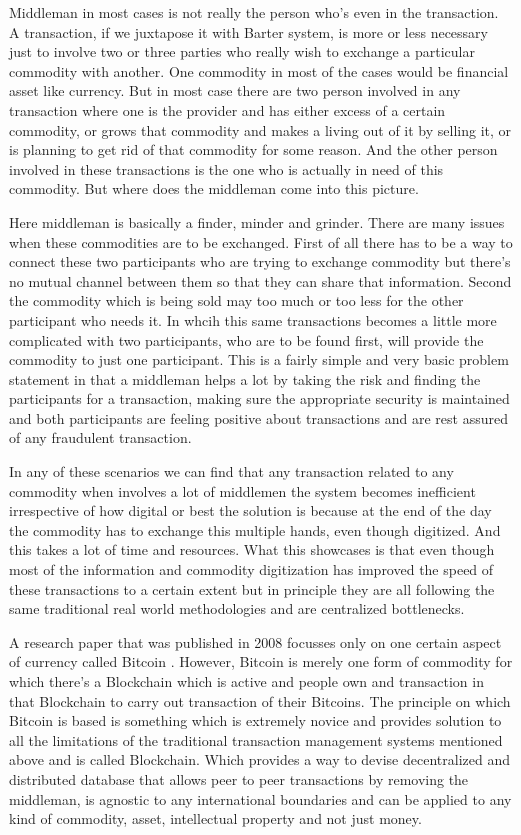 Middleman in most cases is not really the person who's even in the transaction. A transaction, if we juxtapose it with Barter system, is more or less necessary just to involve two or three parties who really wish to exchange a particular commodity with another. One commodity in most of the cases would be financial asset like currency. But in most case there are two person involved in any transaction where one is the provider and has either excess of a certain commodity, or grows that commodity and makes a living out of it by selling it, or is planning to get rid of that commodity for some reason. And the other person involved in these transactions is the one who is actually in need of this commodity. But where does the middleman come into this picture.

Here middleman is basically a finder, minder and grinder. There are many issues when these commodities are to be exchanged. First of all there has to be a way to connect these two participants who are trying to exchange commodity but there's no mutual channel between them so that they can share that information. Second the commodity which is being sold may too much or too less for the other participant who needs it. In whcih this same transactions becomes a little more complicated with two participants, who are to be found first, will provide the commodity to just one participant. This is a fairly simple and very basic problem statement in that a middleman helps a lot by taking the risk and finding the participants for a transaction, making sure the appropriate security is maintained and both participants are feeling positive about transactions and are rest assured of any fraudulent transaction.

In any of these scenarios we can find that any transaction related to any commodity when involves a lot of middlemen the system becomes inefficient irrespective of how digital or best the solution is because at the end of the day the commodity has to exchange this multiple hands, even though digitized. And this takes a lot of time and resources. What this showcases is that even though most of the information and commodity digitization has improved the speed of these transactions to a certain extent but in principle they are all following the same traditional real world methodologies and are centralized bottlenecks.

A research paper that was published in 2008 focusses only on one certain aspect of currency called Bitcoin \cite{bitcoin12}. However, Bitcoin is merely one form of commodity for which there's a Blockchain which is active and people own and transaction in that Blockchain to carry out transaction of their Bitcoins. The principle on which Bitcoin is based is something which is extremely novice and provides solution to all the limitations of the traditional transaction management systems mentioned above and is called Blockchain. Which provides a way to devise decentralized and distributed database that allows peer to peer transactions by removing the middleman, is agnostic to any international boundaries and can be applied to any kind of commodity, asset, intellectual property and not just money.


